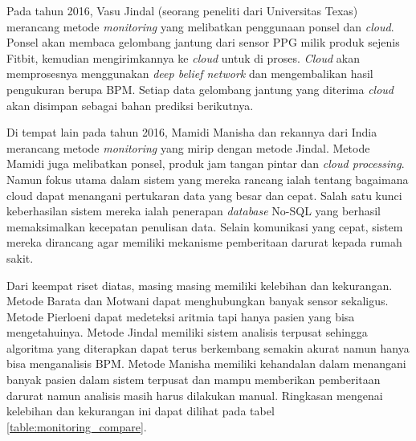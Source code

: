 Pada tahun 2016, Vasu Jindal (seorang peneliti dari Universitas Texas) merancang metode \textit{monitoring} yang melibatkan penggunaan ponsel dan \textit{cloud}\cite{vasu_jindal}. Ponsel akan membaca gelombang jantung dari sensor PPG milik produk sejenis Fitbit, kemudian mengirimkannya ke \textit{cloud} untuk di proses. \textit{Cloud} akan memprosesnya menggunakan \textit{deep belief network} dan mengembalikan hasil pengukuran berupa BPM. Setiap data gelombang jantung yang diterima \textit{cloud} akan disimpan sebagai bahan prediksi berikutnya.

Di tempat lain pada tahun 2016, Mamidi Manisha dan rekannya dari India merancang metode \textit{monitoring} yang mirip dengan metode Jindal. Metode Mamidi juga melibatkan ponsel, produk jam tangan pintar dan \textit{cloud processing}\cite{mamidi}. Namun fokus utama dalam sistem yang mereka rancang ialah tentang bagaimana cloud dapat menangani pertukaran data yang besar dan cepat. Salah satu kunci keberhasilan sistem mereka ialah penerapan \textit{database} No-SQL yang berhasil memaksimalkan kecepatan penulisan data. Selain komunikasi yang cepat, sistem mereka dirancang agar memiliki mekanisme pemberitaan darurat kepada rumah sakit.

Dari keempat riset diatas, masing masing memiliki kelebihan dan kekurangan. Metode Barata dan Motwani dapat menghubungkan banyak sensor sekaligus. Metode Pierloeni dapat medeteksi aritmia tapi hanya pasien yang bisa mengetahuinya. Metode Jindal memiliki sistem analisis terpusat sehingga algoritma yang diterapkan dapat terus berkembang semakin akurat namun hanya bisa menganalisis BPM. Metode Manisha memiliki kehandalan dalam menangani banyak pasien dalam sistem terpusat dan mampu memberikan pemberitaan darurat namun analisis masih harus dilakukan manual. Ringkasan mengenai kelebihan dan kekurangan ini dapat dilihat pada tabel \ref{table:monitoring_compare}.

